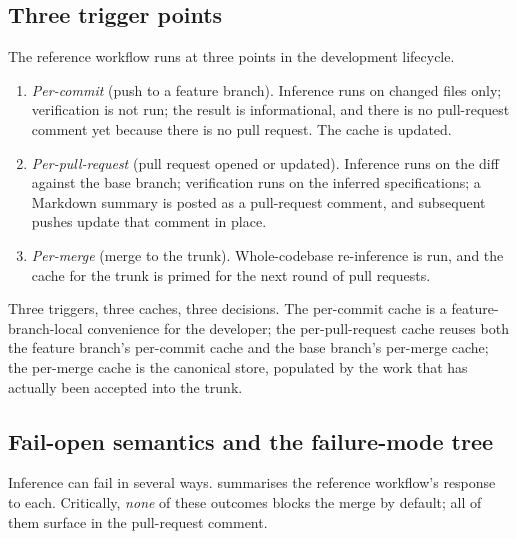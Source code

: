 \subsection{Three trigger points}

The reference workflow runs at three points in the development lifecycle.

\begin{enumerate}
    \item \emph{Per-commit} (push to a feature branch). Inference runs on changed
    files only; verification is not run; the result is informational, and there
    is no pull-request comment yet because there is no pull request. The cache is
    updated.

    \item \emph{Per-pull-request} (pull request opened or updated). Inference
    runs on the diff against the base branch; verification runs on the inferred
    specifications; a Markdown summary is posted as a pull-request comment, and
    subsequent pushes update that comment in place.

    \item \emph{Per-merge} (merge to the trunk). Whole-codebase re-inference is
    run, and the cache for the trunk is primed for the next round of pull
    requests.
\end{enumerate}

Three triggers, three caches, three decisions. The per-commit cache is a
feature-branch-local convenience for the developer; the per-pull-request cache
reuses both the feature branch's per-commit cache and the base branch's per-merge
cache; the per-merge cache is the canonical store, populated by the work that has
actually been accepted into the trunk.

\subsection{Fail-open semantics and the failure-mode tree}

Inference can fail in several ways.  summarises the
reference workflow's response to each. Critically, \emph{none} of these outcomes
blocks the merge by default; all of them surface in the pull-request comment.

